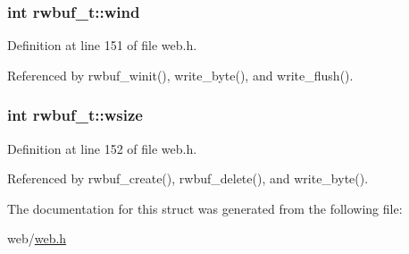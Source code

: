 \subsubsection[{\texorpdfstring{wind}{wind}}]{\setlength{\rightskip}{0pt plus 5cm}int rwbuf\+\_\+t\+::wind}\hypertarget{structrwbuf__t_a135345eee44e93f37e57dbabec12c339}{}\label{structrwbuf__t_a135345eee44e93f37e57dbabec12c339}


Definition at line 151 of file web.\+h.



Referenced by rwbuf\+\_\+winit(), write\+\_\+byte(), and write\+\_\+flush().

\subsubsection[{\texorpdfstring{wsize}{wsize}}]{\setlength{\rightskip}{0pt plus 5cm}int rwbuf\+\_\+t\+::wsize}\hypertarget{structrwbuf__t_ac723cf150dd35d0f67ba7d38b18863ad}{}\label{structrwbuf__t_ac723cf150dd35d0f67ba7d38b18863ad}


Definition at line 152 of file web.\+h.



Referenced by rwbuf\+\_\+create(), rwbuf\+\_\+delete(), and write\+\_\+byte().



The documentation for this struct was generated from the following file\+:\begin{DoxyCompactItemize}
\item 
web/\hyperlink{web_8h}{web.\+h}\end{DoxyCompactItemize}
